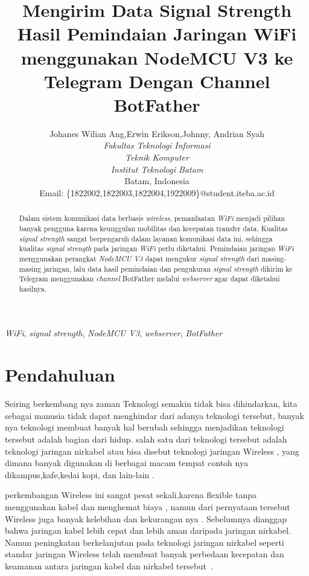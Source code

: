 \documentclass[conference]{IEEEtran}
\title{Mengirim Data Signal Strength Hasil Pemindaian Jaringan WiFi menggunakan NodeMCU V3 ke Telegram Dengan Channel BotFather}
\author{Johanes Wilian Ang\IEEEauthorrefmark{1},Erwin Erikson\IEEEauthorrefmark{2},Johnny\IEEEauthorrefmark{3}, Andrian Syah\IEEEauthorrefmark{4}\\
\textit{Fakultas Teknologi Informasi}\\
\textit{Teknik Komputer}\\
\textit{Institut Teknologi Batam}\\
Batam, Indonesia\\
Email: \{\IEEEauthorrefmark{1}1822002,\IEEEauthorrefmark{2}1822003,\IEEEauthorrefmark{3}1822004,\IEEEauthorrefmark{4}1922009\}@student.iteba.ac.id}
\begin{document}
\maketitle

\begin{abstract}
    Dalam sistem komunikasi data berbasis \emph{wireless}, pemanfaatan \emph{WiFi} 
    menjadi pilihan banyak pengguna karena keunggulan mobilitas dan kecepatan transfer data.
     Kualitas \emph{signal strength} sangat berpengaruh dalam layanan komunikasi data ini, 
     sehingga kualitas \emph{signal strength} pada jaringan \emph{WiFi} perlu diketahui.
      Pemindaian jaringan \emph{WiFi} menggunakan perangkat \emph{NodeMCU V3} dapat mengukur \emph{signal strength} dari 
      masing-masing jaringan, lalu data hasil pemindaian dan pengukuran \emph{signal strength} dikirim ke
       Telegram menggunakan \emph{channel} BotFather melalui \emph{webserver} agar dapat diketahui hasilnya.
\end{abstract}

\begin{IEEEkeywords}
    \emph{WiFi}, \emph{signal strength}, \emph{NodeMCU V3}, \emph{webserver}, \emph{BotFather}
\end{IEEEkeywords}

\section{Pendahuluan}
Seiring berkembang nya zaman Teknologi semakin tidak bisa dihindarkan, 
kita sebagai manusia tidak dapat menghindar dari adanya teknologi tersebut,
banyak nya teknologi membuat banyak hal berubah sehingga menjadikan teknologi tersebut 
adalah bagian dari hidup. salah satu dari teknologi tersebut adalah teknologi jaringan nirkabel
atau bisa disebut teknologi jaringan Wireless , yang dimana banyak digunakan di berbagai macam tempat 
contoh nya dikampus,kafe,kedai kopi, dan lain-lain .

perkembangan Wireless ini sangat pesat sekali,karena flexible tanpa menggunakan kabel dan menghemat biaya 
, namun dari pernyataan tersebut Wireless juga banyak kelebihan dan kekurangan nya . 
Sebelumnya dianggap bahwa jaringan kabel lebih cepat dan lebih aman daripada jaringan nirkabel.
Namun peningkatan berkelanjutan pada teknologi jaringan nirkabel seperti standar jaringan Wireless
 telah membuat banyak perbedaan kecepatan dan keamanan antara jaringan kabel dan nirkabel tersebut~.
\end{document}

